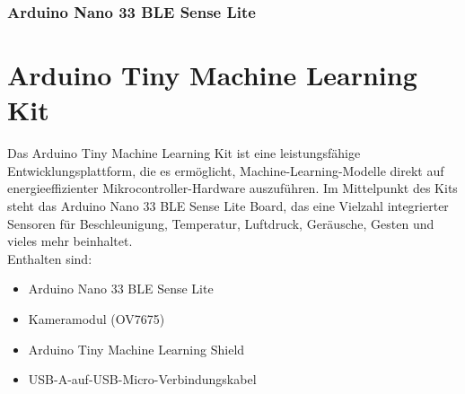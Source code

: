 \subsection{Arduino Nano 33 BLE Sense Lite}

\chapter{Arduino Tiny Machine Learning Kit}
Das Arduino Tiny Machine Learning Kit ist eine leistungsfähige Entwicklungsplattform, die es ermöglicht, Machine-Learning-Modelle direkt auf energieeffizienter Mikrocontroller-Hardware auszuführen. Im Mittelpunkt des Kits steht das Arduino Nano 33 BLE Sense Lite Board, das eine Vielzahl integrierter Sensoren für Beschleunigung, Temperatur, Luftdruck, Geräusche, Gesten und vieles mehr beinhaltet. \cite{Reichelt_ArduinoKit:2025} \\
Enthalten sind:
\begin{itemize}
	\item Arduino Nano 33 BLE Sense Lite
	\item Kameramodul (OV7675)
	\item Arduino Tiny Machine Learning Shield
	\item USB-A-auf-USB-Micro-Verbindungskabel
\end{itemize}



